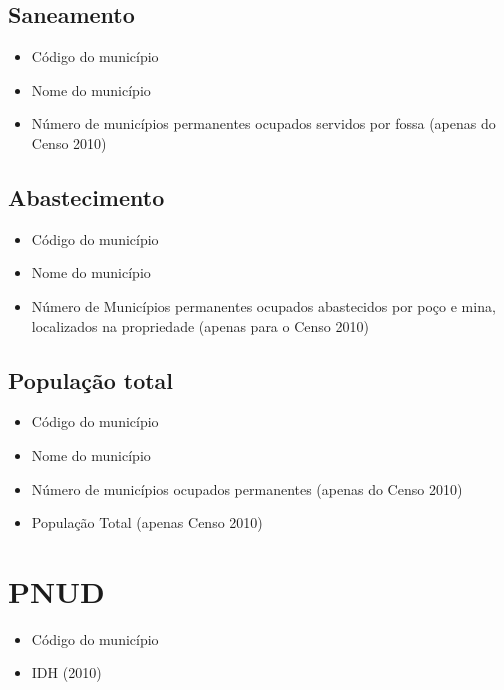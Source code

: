 \documentclass[]{book}
\providecommand{\tightlist}{%
  \setlength{\itemsep}{0pt}\setlength{\parskip}{0pt}}
\begin{document}
\hypertarget{saneamento}{%
\subsection{Saneamento}\label{saneamento}}

\begin{itemize}
\tightlist
\item
  Código do município
\item
  Nome do município
\item
  Número de municípios permanentes ocupados servidos por fossa (apenas do Censo 2010)
\end{itemize}

\hypertarget{abastecimento}{%
\subsection{Abastecimento}\label{abastecimento}}

\begin{itemize}
\tightlist
\item
  Código do município
\item
  Nome do município
\item
  Número de Municípios permanentes ocupados abastecidos por poço e mina, localizados na propriedade (apenas para o Censo 2010)
\end{itemize}

\hypertarget{populauxe7uxe3o-total}{%
\subsection{População total}\label{populauxe7uxe3o-total}}

\begin{itemize}
\tightlist
\item
  Código do município
\item
  Nome do município
\item
  Número de municípios ocupados permanentes (apenas do Censo 2010)
\item
  População Total (apenas Censo 2010)
\end{itemize}

\hypertarget{pnud}{%
\section{PNUD}\label{pnud}}

\begin{itemize}
\tightlist
\item
  Código do município
\item
  IDH (2010)
\end{itemize}
\end{document}

